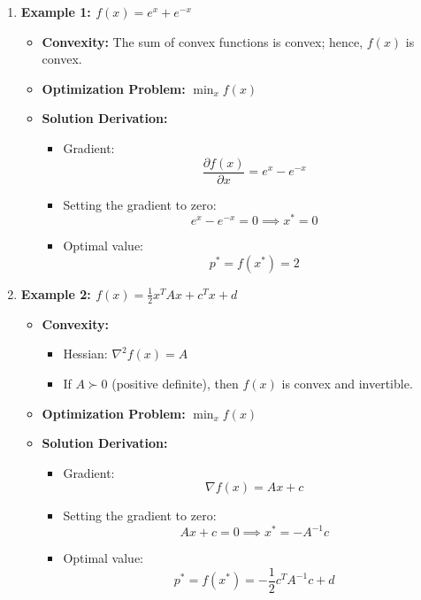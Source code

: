 \begin{example}
    \begin{enumerate}
        \item \textbf{Example 1: \( f(x) = e^x + e^{-x} \)}
        \begin{itemize}
            \item \textbf{Convexity:} 
            The sum of convex functions is convex; hence, \( f(x) \) is convex.
        
            \item \textbf{Optimization Problem:} 
            \(\min_x f(x)\)
        
            \item \textbf{Solution Derivation:}
            \begin{itemize}
                \item Gradient: 
                \[
                \frac{\partial f(x)}{\partial x} = e^x - e^{-x}
                \]
                \item Setting the gradient to zero: 
                \[
                e^x - e^{-x} = 0 \implies x^* = 0
                \]
                \item Optimal value: 
                \[
                p^* = f(x^*) = 2
                \]
            \end{itemize}
        \end{itemize}
        
        \item \textbf{Example 2: \( f(x) = \frac{1}{2} x^T A x + c^T x + d \)}
        \begin{itemize}
            \item \textbf{Convexity:} 
            \begin{itemize}
                \item Hessian: \( \nabla^2 f(x) = A \)
                \item If \( A \succ 0 \) (positive definite), then \( f(x) \) is convex and invertible.
            \end{itemize}
        
            \item \textbf{Optimization Problem:} 
            \(\min_x f(x)\)
        
            \item \textbf{Solution Derivation:}
            \begin{itemize}
                \item Gradient: 
                \[
                \nabla f(x) = A x + c
                \]
                \item Setting the gradient to zero: 
                \[
                A x + c = 0 \implies x^* = -A^{-1} c
                \]
                \item Optimal value: 
                \[
                p^* = f(x^*) = -\frac{1}{2} c^T A^{-1} c + d
                \]
            \end{itemize}
        \end{itemize}
        

\end{enumerate}
\end{example}
